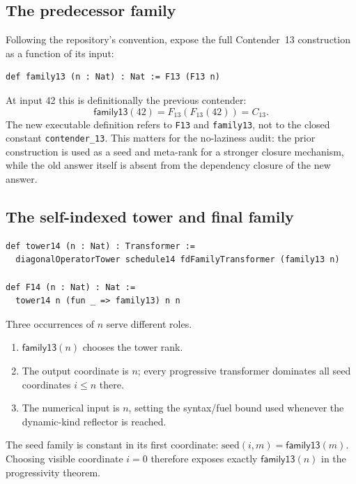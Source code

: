 \documentclass[11pt]{article}
\theoremstyle{definition}
\theoremstyle{remark}
\newcommand{\lean}[1]{\texttt{#1}}
\newcommand{\C}[1]{C_{#1}}
\begin{document}
\subsection{The predecessor family}

Following the repository's convention, expose the full Contender~13
construction as a function of its input:

\begin{lstlisting}
def family13 (n : Nat) : Nat := F13 (F13 n)
\end{lstlisting}

At input 42 this is definitionally the previous contender:
\[
\mathsf{family13}(42)=F_{13}(F_{13}(42))=\C{13}.
\]
The new executable definition refers to \lean{F13} and \lean{family13}, not to
the closed constant \lean{contender\_13}.  This matters for the no-laziness
audit: the prior construction is used as a seed and meta-rank for a stronger
closure mechanism, while the old answer itself is absent from the dependency
closure of the new answer.

\subsection{The self-indexed tower and final family}

\begin{lstlisting}
def tower14 (n : Nat) : Transformer :=
  diagonalOperatorTower schedule14 fdFamilyTransformer (family13 n)

def F14 (n : Nat) : Nat :=
  tower14 n (fun _ => family13) n n
\end{lstlisting}

Three occurrences of $n$ serve different roles.

\begin{enumerate}[leftmargin=*]
\item $\mathsf{family13}(n)$ chooses the tower rank.
\item The output coordinate is $n$; every progressive transformer dominates
  all seed coordinates $i\le n$ there.
\item The numerical input is $n$, setting the syntax/fuel bound used whenever
  the dynamic-kind reflector is reached.
\end{enumerate}

The seed family is constant in its first coordinate:
$\mathrm{seed}(i,m)=\mathsf{family13}(m)$.  Choosing visible coordinate $i=0$
therefore exposes exactly $\mathsf{family13}(n)$ in the progressivity theorem.
\end{document}
